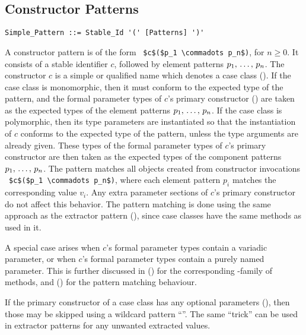 \subsection{Constructor Patterns}
\label{sec:constructor-patterns}

\syntax\begin{lstlisting}
Simple_Pattern ::= Stable_Id '(' [Patterns] ')'
\end{lstlisting}

A constructor pattern is of the form ~\lstinline!$c$($p_1 \commadots p_n$)!, for $n \geq 0$. It consists of a stable identifier $c$, followed by element patterns $p_1 ,\, \ldots ,\, p_n$. The constructor $c$ is a simple or qualified name which denotes a case class (). If the case class is monomorphic, then it must conform to the expected type of the pattern, and the formal parameter types of $c$'s primary constructor () are taken as the expected types of the element patterns $p_1 ,\, \ldots ,\, p_n$. If the case class is polymorphic, then its type parameters are instantiated so that the instantiation of $c$ conforms to the expected type of the pattern, unless the type arguments are already given. These types of the formal parameter types of $c$'s primary constructor are then taken as the expected types of the component patterns $p_1 ,\, \ldots ,\, p_n$. The pattern matches all objects created from constructor invocations ~\lstinline!$c$($p_1 \commadots p_n$)!, where each element pattern $p_i$ matches the corresponding value $v_i$. Any extra parameter sections of $c$'s primary constructor do not affect this behavior. The pattern matching is done using the same approach as the extractor pattern (), since case classes have the same  methods as used in it. 

A special case arises when $c$'s formal parameter types contain a variadic parameter, or when $c$'s formal parameter types contain a purely named parameter. This is further discussed in () for the corresponding -family of methods, and () for the pattern matching behaviour. 

If the primary constructor of a case class has any optional parameters (), then those may be skipped using a wildcard pattern ``\code{_}''. The same ``trick'' can be used in extractor patterns for any unwanted extracted values. 






